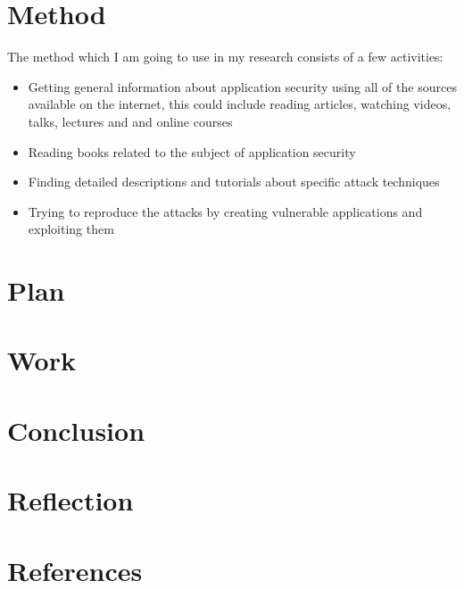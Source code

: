 \documentclass[a4paper]{article}
\begin{document}
\section{Method}
The method which I am going to use in my research consists of a few activities:
\begin{itemize}
	\item Getting general information about application security using all of the sources available on the internet, this could include reading articles, watching videos, talks, lectures and and online courses
	\item Reading books related to the subject of application security
	\item Finding detailed descriptions and tutorials about specific attack techniques
	\item Trying to reproduce the attacks by creating vulnerable applications and exploiting them
\end{itemize}
\section{Plan}

\section{Work}

\section{Conclusion}

\section{Reflection}

\section{References}
\end{document}

